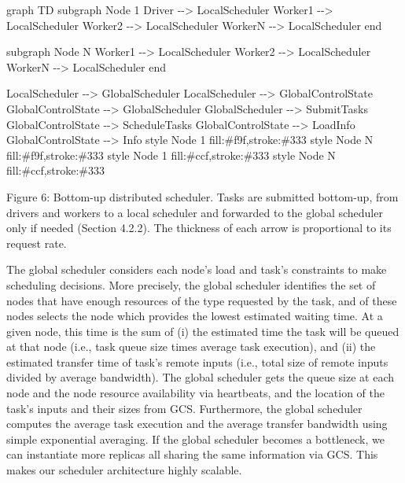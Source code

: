 \documentclass[
]{article}
\newenvironment{Shaded}{}{}
\newcommand{\NormalTok}[1]{#1}
\begin{document}
\begin{Shaded}
\begin{Highlighting}[]
\NormalTok{graph TD}
\NormalTok{    subgraph Node 1}
\NormalTok{        Driver {-}{-}\textgreater{} LocalScheduler}
\NormalTok{        Worker1 {-}{-}\textgreater{} LocalScheduler}
\NormalTok{        Worker2 {-}{-}\textgreater{} LocalScheduler}
\NormalTok{        WorkerN {-}{-}\textgreater{} LocalScheduler}
\NormalTok{    end}

\NormalTok{    subgraph Node N}
\NormalTok{        Worker1 {-}{-}\textgreater{} LocalScheduler}
\NormalTok{        Worker2 {-}{-}\textgreater{} LocalScheduler}
\NormalTok{        WorkerN {-}{-}\textgreater{} LocalScheduler}
\NormalTok{    end}

\NormalTok{    LocalScheduler {-}{-}\textgreater{} GlobalScheduler}
\NormalTok{    LocalScheduler {-}{-}\textgreater{} GlobalControlState}
\NormalTok{    GlobalControlState {-}{-}\textgreater{} GlobalScheduler}
\NormalTok{    GlobalScheduler {-}{-}\textgreater{} SubmitTasks}
\NormalTok{    GlobalControlState {-}{-}\textgreater{} ScheduleTasks}
\NormalTok{    GlobalControlState {-}{-}\textgreater{} LoadInfo}
\NormalTok{    GlobalControlState {-}{-}\textgreater{} Info}
\NormalTok{    style Node 1 fill:\#f9f,stroke:\#333}
\NormalTok{    style Node N fill:\#f9f,stroke:\#333}
\NormalTok{    style Node 1 fill:\#ccf,stroke:\#333}
\NormalTok{    style Node N fill:\#ccf,stroke:\#333}
\end{Highlighting}
\end{Shaded}

Figure 6: Bottom-up distributed scheduler. Tasks are submitted
bottom-up, from drivers and workers to a local scheduler and forwarded
to the global scheduler only if needed (Section 4.2.2). The thickness of
each arrow is proportional to its request rate.

The global scheduler considers each node's load and task's constraints
to make scheduling decisions. More precisely, the global scheduler
identifies the set of nodes that have enough resources of the type
requested by the task, and of these nodes selects the node which
provides the lowest estimated waiting time. At a given node, this time
is the sum of (i) the estimated time the task will be queued at that
node (i.e., task queue size times average task execution), and (ii) the
estimated transfer time of task's remote inputs (i.e., total size of
remote inputs divided by average bandwidth). The global scheduler gets
the queue size at each node and the node resource availability via
heartbeats, and the location of the task's inputs and their sizes from
GCS. Furthermore, the global scheduler computes the average task
execution and the average transfer bandwidth using simple exponential
averaging. If the global scheduler becomes a bottleneck, we can
instantiate more replicas all sharing the same information via GCS. This
makes our scheduler architecture highly scalable.
\end{document}
